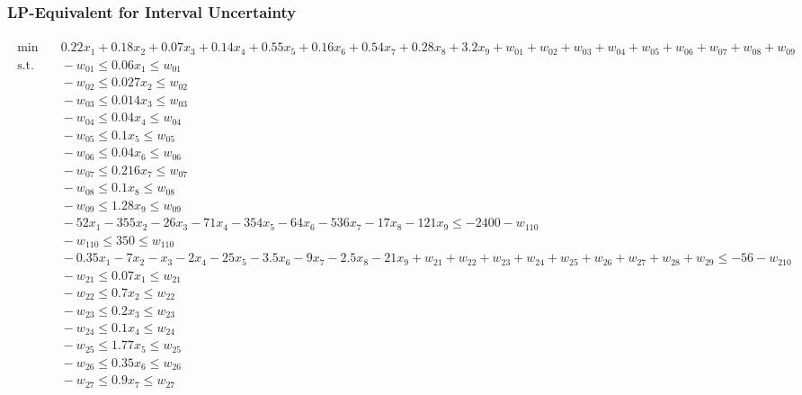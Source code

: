 \documentclass[a4paper,12pt]{article}
\begin{document}
\subsubsection*{LP-Equivalent for Interval Uncertainty}
\label{sec:lp-equivalent-interval}
\begin{adjustwidth}{-1.5cm}{}
\begin{tiny}
\setlength{\jot}{0pt}
\[
\begin{aligned}
   \begin{aligned}
    \min & \quad  0.22x_1 + 0.18x_2 + 0.07x_3 + 0.14x_4 + 0.55x_5 + 0.16x_6 + 0.54x_7 + 0.28x_8 + 3.2x_9 + w_{01} + w_{02} + w_{03} + w_{04} + w_{05} + w_{06} + w_{07}+ w_{08}+ w_{09} \\
    \text{s.t.} & \quad -w_{01} \leq 0.06x_1 \leq w_{01} \\
    & \quad -w_{02} \leq 0.027x_2 \leq w_{02} \\
    & \quad -w_{03} \leq 0.014x_3 \leq w_{03} \\
    & \quad -w_{04} \leq 0.04x_4 \leq w_{04} \\
    & \quad -w_{05} \leq 0.1x_5 \leq w_{05} \\
    & \quad -w_{06} \leq 0.04x_6 \leq w_{06} \\
    & \quad -w_{07} \leq 0.216x_7 \leq w_{07} \\
    & \quad -w_{08} \leq 0.1x_8 \leq w_{08} \\
    & \quad -w_{09} \leq 1.28x_9 \leq w_{09} \\
    & \quad -52x_1-355x_2-26x_3-71x_4-354x_5-64x_6-536x_7-17x_8-121x_9 \leq -2400 - w_{110}\\
    & \quad -w_{110} \leq 350 \leq w_{110} \\
    & \quad -0.35x_1 - 7x_2 - x_3 - 2x_4 - 25x_5 - 3.5x_6 - 9x_7 - 2.5x_8 - 21x_9 + w_{21} + w_{22} + w_{23} + w_{24} + w_{25} + w_{26} + w_{27}+ w_{28}+ w_{29} \leq -56 - w_{210} \\
    & \quad -w_{21} \leq 0.07x_1 \leq w_{21} \\
    & \quad -w_{22} \leq 0.7x_2 \leq w_{22} \\
    & \quad -w_{23} \leq 0.2x_3 \leq w_{23} \\
    & \quad -w_{24} \leq 0.1x_4 \leq w_{24} \\
    & \quad -w_{25} \leq 1.77x_5 \leq w_{25} \\
    & \quad -w_{26} \leq 0.35x_6 \leq w_{26} \\
    & \quad -w_{27} \leq 0.9x_7 \leq w_{27} \\

\end{aligned}
\end{aligned}\]
\end{tiny}
\end{adjustwidth}
\end{document}
